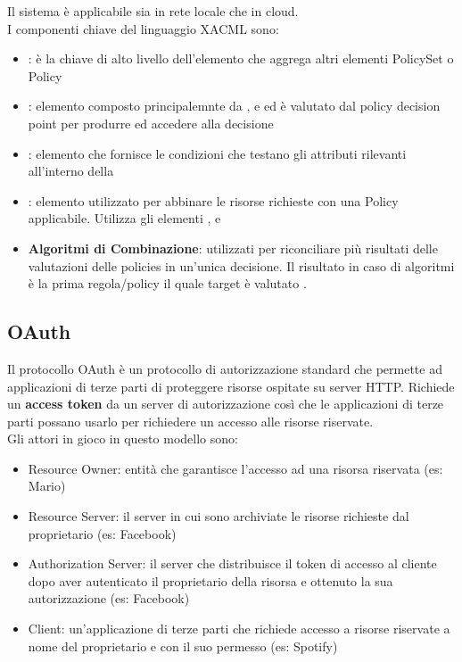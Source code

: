 Il sistema è applicabile sia in rete locale che in cloud.\\
I componenti chiave del linguaggio \acrshort{XACML} sono:
\begin{itemize}[noitemsep]
    \item {}: è la chiave di alto livello dell'elemento che aggrega altri elementi PolicySet o Policy
    \item {}: elemento composto principalemnte da ,  e  ed è valutato dal policy decision point per produrre ed accedere alla decisione
    \item {}: elemento che fornisce le condizioni che testano gli attributi rilevanti all'interno della 
    \item {}: elemento utilizzato per abbinare le risorse richieste con una Policy applicabile. Utilizza gli elementi ,  e 
    \item \textbf{Algoritmi di Combinazione}: utilizzati per riconciliare più risultati delle valutazioni delle policies in un'unica decisione. Il risultato in caso di algoritmi  è la prima regola/policy il quale target è valutato .
\end{itemize}

\subsection{OAuth}
Il protocollo OAuth è un protocollo di autorizzazione standard che permette ad applicazioni di terze parti di proteggere risorse ospitate su server \acrshort{HTTP}.
Richiede un \textbf{access token} da un server di autorizzazione così che le applicazioni di terze parti possano usarlo per richiedere un accesso alle risorse riservate.\\
Gli attori in gioco in questo modello sono:
\begin{itemize}[noitemsep]
    \item Resource Owner: entità che garantisce l'accesso ad una risorsa riservata (es: Mario)
    \item Resource Server: il server in cui sono archiviate le risorse richieste dal proprietario (es: Facebook)
    \item Authorization Server: il server che distribuisce il token di accesso al cliente dopo aver autenticato il proprietario della risorsa e ottenuto la sua autorizzazione (es: Facebook)
    \item Client: un'applicazione di terze parti che richiede accesso a risorse riservate a nome del proprietario e con il suo permesso (es: Spotify)
\end{itemize}

